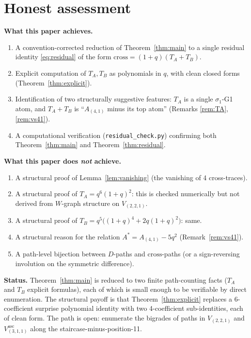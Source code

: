 \documentclass[11pt]{article}
\theoremstyle{definition}
\begin{document}
\section{Honest assessment}

\textbf{What this paper achieves.}
\begin{enumerate}[leftmargin=2em,topsep=0.3em,itemsep=0.2em]
\item A convention-corrected reduction of Theorem~\ref{thm:main} to a single residual identity \eqref{eq:residual} of the form $\mathrm{cross} = (1+q)(T_A + T_B)$.
\item Explicit computation of $T_A, T_B$ as polynomials in $q$, with clean closed forms (Theorem~\ref{thm:explicit}).
\item Identification of two structurally suggestive features: $T_A$ is a single $\sigma_1$-G1 atom, and $T_A + T_B$ is ``$A_{(4,1)}$ minus its top atom'' (Remarks \ref{rem:TA}, \ref{rem:vs41}).
\item A computational verification (\texttt{residual\_check.py}) confirming both Theorem~\ref{thm:main} and Theorem~\ref{thm:residual}.
\end{enumerate}

\textbf{What this paper does \emph{not} achieve.}
\begin{enumerate}[leftmargin=2em,topsep=0.3em,itemsep=0.2em]
\item A structural proof of Lemma~\ref{lem:vanishing} (the vanishing of 4 cross-traces).
\item A structural proof of $T_A = q^6(1+q)^2$: this is checked numerically but not derived from $W$-graph structure on $V_{(2,2,1)}$.
\item A structural proof of $T_B = q^5\bigl((1+q)^4 + 2q(1+q)^2\bigr)$: same.
\item A structural reason for the relation $A^* = A_{(4,1)} - 5q^2$ (Remark~\ref{rem:vs41}).
\item A path-level bijection between $D$-paths and $\mathrm{cross}$-paths (or a sign-reversing involution on the symmetric difference).
\end{enumerate}

\textbf{Status.} Theorem~\ref{thm:main} is reduced to two finite path-counting facts ($T_A$ and $T_B$ explicit formulas), each of which is small enough to be verifiable by direct enumeration. The structural payoff is that Theorem~\ref{thm:explicit} replaces a 6-coefficient surprise polynomial identity with two 4-coefficient sub-identities, each of clean form. The path is open: enumerate the bigrades of paths in $V_{(2,2,1)}$ and $V_{(3,1,1)}^{\mathrm{asc}}$ along the staircase-minus-position-11.
\end{document}

